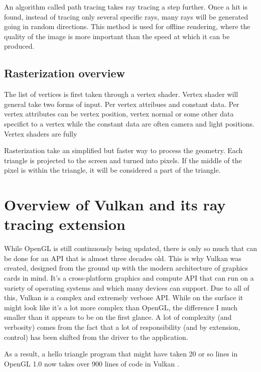 \documentclass[times, utf8, zavrsni, numeric]{fer}
\begin{document}
An algorithm called path tracing takes ray tracing a step further. Once a hit is found, instead of tracing only several specific rays, many rays will be generated going in random directions. This method is used for offline rendering, where the quality of the image is more important than the speed at which it can be produced.

\section{Rasterization overview}
The list of vertices is first taken through a vertex shader. Vertex shader will general take two forms of input. Per vertex attribues and constant data. Per vertex attributes can be vertex position, vertex normal or some other data specifict to a vertex while the constant data are often camera and light positions. Vertex shaders are fully 

Rasterization take an simplified but faster way to process the geometry. Each triangle is projected to the screen and turned into pixels. If the middle of the pixel is within the triangle, it will be considered a part of the triangle.

\chapter{Overview of Vulkan and its ray tracing extension}
While OpenGL is still continuously being updated, there is only so much that can be done for an API that is almost three decades old. This is why Vulkan was created, designed from the ground up with the modern architecture of graphics cards in mind. It's a cross-platform graphics and compute API that can run on a variety of operating systems and which many devices can support. Due to all of this, Vulkan is a complex and extremely verbose API. While on the surface it might look like it's a lot more complex than OpenGL, the difference I much smaller than it appears to be on the first glance. A lot of complexity (and verbosity) comes from the fact that a lot of responsibility (and by extension, control) has been shifted from the driver to the application.

As a result, a hello triangle program that might have taken 20 or so lines in OpenGL 1.0 now takes over 900 lines of code in Vulkan \cite{vulkan_tutorial}.
\end{document}
